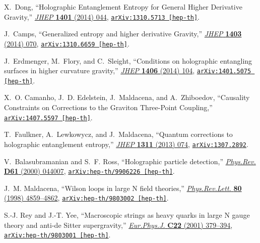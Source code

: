 \documentclass[12pt]{article}
\begin{document}
\begin{thebibliography}{10}
X.~Dong, ``{Holographic Entanglement Entropy for General Higher Derivative
  Gravity},'' \href{http://dx.doi.org/10.1007/JHEP01(2014)044}{{\em JHEP} {\bf
  1401} (2014)  044},
\href{http://arxiv.org/abs/1310.5713}{{\tt arXiv:1310.5713 [hep-th]}}.

J.~Camps, ``{Generalized entropy and higher derivative Gravity},''
  \href{http://dx.doi.org/10.1007/JHEP03(2014)070}{{\em JHEP} {\bf 1403} (2014)
   070},
\href{http://arxiv.org/abs/1310.6659}{{\tt arXiv:1310.6659 [hep-th]}}.

J.~Erdmenger, M.~Flory, and C.~Sleight, ``{Conditions on holographic entangling
  surfaces in higher curvature gravity},''
  \href{http://dx.doi.org/10.1007/JHEP06(2014)104}{{\em JHEP} {\bf 1406} (2014)
   104},
\href{http://arxiv.org/abs/1401.5075}{{\tt arXiv:1401.5075 [hep-th]}}.

X.~O. Camanho, J.~D. Edelstein, J.~Maldacena, and A.~Zhiboedov, ``{Causality
  Constraints on Corrections to the Graviton Three-Point Coupling},''
\href{http://arxiv.org/abs/1407.5597}{{\tt arXiv:1407.5597 [hep-th]}}.

T.~Faulkner, A.~Lewkowycz, and J.~Maldacena, ``{Quantum corrections to
  holographic entanglement entropy},''
  \href{http://dx.doi.org/10.1007/JHEP11(2013)074}{{\em JHEP} {\bf 1311} (2013)
   074},
\href{http://arxiv.org/abs/1307.2892}{{\tt arXiv:1307.2892}}.

V.~Balasubramanian and S.~F. Ross, ``{Holographic particle detection},''
  \href{http://dx.doi.org/10.1103/PhysRevD.61.044007}{{\em Phys.Rev.} {\bf D61}
  (2000)  044007},
\href{http://arxiv.org/abs/hep-th/9906226}{{\tt arXiv:hep-th/9906226
  [hep-th]}}.

J.~M. Maldacena, ``{Wilson loops in large N field theories},''
  \href{http://dx.doi.org/10.1103/PhysRevLett.80.4859}{{\em Phys.Rev.Lett.}
  {\bf 80} (1998)  4859--4862},
\href{http://arxiv.org/abs/hep-th/9803002}{{\tt arXiv:hep-th/9803002
  [hep-th]}}.

S.-J. Rey and J.-T. Yee, ``{Macroscopic strings as heavy quarks in large N
  gauge theory and anti-de Sitter supergravity},''
  \href{http://dx.doi.org/10.1007/s100520100799}{{\em Eur.Phys.J.} {\bf C22}
  (2001)  379--394},
\href{http://arxiv.org/abs/hep-th/9803001}{{\tt arXiv:hep-th/9803001
  [hep-th]}}.


\end{thebibliography}
\end{document}
